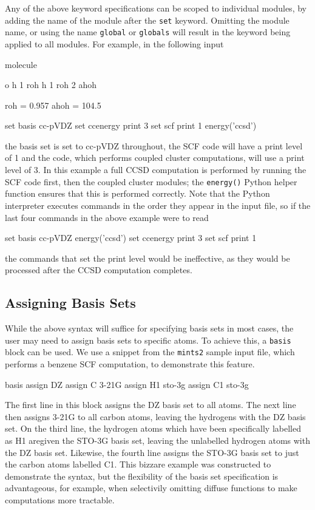 Any of the above keyword specifications can be scoped to individual modules,
by adding the name of the module after the {\tt set} keyword. Omitting the module
name, or using the name {\tt global} or {\tt globals} will result in the keyword being
applied to all modules. For example, in the following input
\begin{Snippet}
molecule{
  o
  h 1 roh
  h 1 roh 2 ahoh

  roh = 0.957
  ahoh = 104.5
}

set basis cc-pVDZ
set ccenergy print 3
set scf print 1
energy('ccsd')
\end{Snippet}
the basis set is set to cc-pVDZ throughout, the SCF code will have a print
level of 1 and the \PSIccenergy code, which performs coupled cluster computations,
will use a print level of 3. In this example a full CCSD computation is
performed by running the SCF code first, then the coupled cluster modules;
the {\tt energy()} Python helper function ensures that this is performed correctly.
Note that the Python interpreter executes commands in the order they appear in
the input file, so if the last four commands in the above example were to read
\begin{Snippet}
set basis cc-pVDZ
energy('ccsd')
set ccenergy print 3
set scf print 1
\end{Snippet}
the commands that set the print level would be ineffective, as they would be
processed after the CCSD computation completes.

\subsection{Assigning Basis Sets} \label{sec:PsithonBasisSets}
While the above syntax will suffice for specifying basis sets in most cases,
the user may need to assign basis sets to specific atoms.  To achieve this, a
{\tt basis} block can be used.  We use a snippet from the {\tt mints2} sample
input file, which performs a benzene SCF computation, to demonstrate this
feature.

\begin{Snippet}
basis {
   assign DZ
   assign C 3-21G
   assign H1 sto-3g
   assign C1 sto-3g
}
\end{Snippet}

The first line in this block assigns the DZ basis set to all atoms.  The next
line then assigns 3-21G to all carbon atoms, leaving the hydrogens with the DZ
basis set.  On the third line, the hydrogen atoms which have been specifically
labelled as H1 aregiven the STO-3G basis set, leaving the unlabelled hydrogen
atoms with the DZ basis set.  Likewise, the fourth line assigns the STO-3G
basis set to just the carbon atoms labelled C1.  This bizzare example was
constructed to demonstrate the syntax, but the flexibility of the basis set
specification is advantageous, for example, when selectivily omitting diffuse
functions to make computations more tractable.

